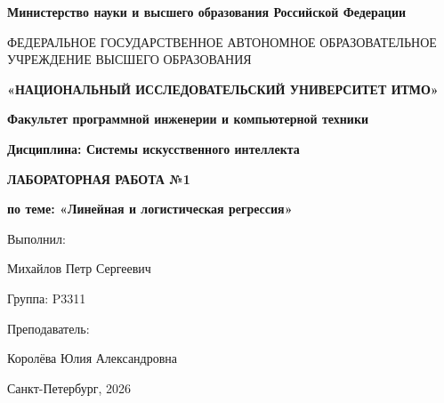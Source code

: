 \documentclass[a4paper,12pt]{article}
\begin{document}
\begin{titlepage}
    \centering

    {\fontsize{11}{13}\selectfont
    \textbf{Министерство науки и высшего образования Российской Федерации}\par}
    \vspace{0.12cm}

    {\fontsize{7}{10}\selectfont
    ФЕДЕРАЛЬНОЕ ГОСУДАРСТВЕННОЕ АВТОНОМНОЕ ОБРАЗОВАТЕЛЬНОЕ УЧРЕЖДЕНИЕ ВЫСШЕГО ОБРАЗОВАНИЯ\par}

    \vspace{0.2cm}

    {\fontsize{14}{17}\selectfont
    \textbf{«НАЦИОНАЛЬНЫЙ ИССЛЕДОВАТЕЛЬСКИЙ УНИВЕРСИТЕТ ИТМО»}\par}

    \vspace{1cm}

    {\fontsize{12}{14}\selectfont
    \textbf{Факультет программной инженерии и компьютерной техники}\par}

    \vspace{1cm}

    {\fontsize{12}{14}\selectfont
    \textbf{Дисциплина: Системы искусственного интеллекта}\par}

    \vspace*{\fill}

    {\fontsize{18}{22}\selectfont
    \textbf{ЛАБОРАТОРНАЯ РАБОТА №1}\par}

    \vspace{0.5cm}

    {\fontsize{14}{17}\selectfont
    \textbf{по теме: «Линейная и логистическая регрессия»}\par}

    \vspace{2cm}

    \begin{flushright}
        \fontsize{12}{14}\selectfont
        Выполнил:\par
        Михайлов Петр Сергеевич\par
        Группа: P3311\par

        \vspace{1em}

        Преподаватель:\par
        Королёва Юлия Александровна
    \end{flushright}

    \vfill

    {\fontsize{12}{14}\selectfont Санкт-Петербург, 2026\par}
\end{titlepage}
\end{document}
